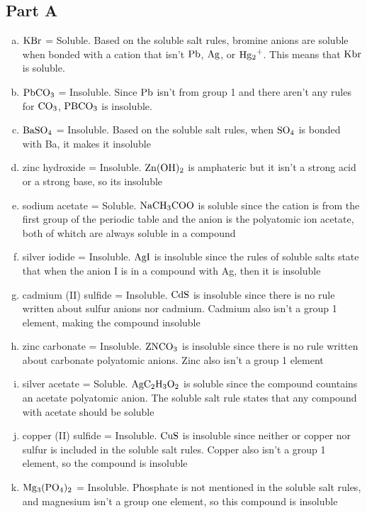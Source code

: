 \documentclass{scrartcl}
\begin{document}
\subsection{Part A}
\label{sec:org09d5a69}
\begin{enumerate}[a.]
\item \(\ce{KBr}\) = Soluble. Based on the soluble salt rules, bromine anions are
soluble when bonded with a cation that isn't \(\ce{Pb}\), \(\ce{Ag}\),
or \(\ce{Hg2+}\). This means that \(\ce{Kbr}\) is soluble.
\item \(\ce{PbCO3}\) = Insoluble. Since \(\ce{Pb}\) isn't from group 1 and there
aren't any rules for \(\ce{CO3}\), \(\ce{PBCO3}\) is insoluble.
\item \(\ce{BaSO4}\) = Insoluble. Based on the soluble salt rules, when
\(\ce{SO4}\) is bonded with Ba, it makes it insoluble
\item zinc hydroxide = Insoluble. \(\ce{Zn(OH)2}\) is amphateric but it isn't a
strong acid or a strong base, so its insoluble
\item sodium acetate = Soluble. \(\ce{NaCH3COO}\) is soluble since the cation is
from the first group of the periodic table and the anion is the polyatomic
ion acetate, both of whitch are always soluble in a compound
\item silver iodide = Insoluble. \(\ce{AgI}\) is insoluble since the rules of
soluble salts state that when the anion I is in a compound with Ag, then it
is insoluble
\item cadmium (II) sulfide = Insoluble. \(\ce{CdS}\) is insoluble since there is
no rule written about sulfur anions nor cadmium. Cadmium also isn't a group 1
element, making the compound insoluble
\item zinc carbonate = Insoluble. \(\ce{ZNCO3}\) is insoluble since there is no
rule written about carbonate polyatomic anions. Zinc also isn't a group 1 element
\item silver acetate = Soluble. \(\ce{AgC2H3O2}\) is soluble since the compound
countains an acetate  polyatomic anion. The soluble salt rule states that any
compound with acetate should be soluble
\item copper (II) sulfide = Insoluble. \(\ce{CuS}\) is insoluble since neither or
copper nor sulfur is included in the soluble salt rules. Copper also isn't a
group 1 element, so the compound is insoluble
\item \(\ce{Mg3(PO4)2}\) = Insoluble. Phosphate is not mentioned in the soluble
salt rules, and magnesium isn't a group one element, so this compound is insoluble

\end{enumerate}
\end{document}
